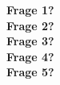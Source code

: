 
\textbf{Frage 1?}\\
\textbf{Frage 2?}\\
\textbf{Frage 3?}\\
\textbf{Frage 4?}\\
\textbf{Frage 5?}\\

